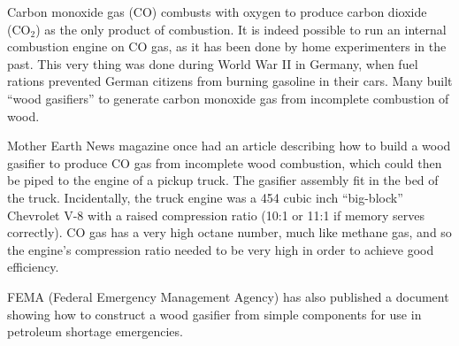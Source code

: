 \vskip 10pt

Carbon monoxide gas (CO) combusts with oxygen to produce carbon dioxide (CO$_{2}$) as the only product of combustion.  It is indeed possible to run an internal combustion engine on CO gas, as it has been done by home experimenters in the past.  This very thing was done during World War II in Germany, when fuel rations prevented German citizens from burning gasoline in their cars.  Many built ``wood gasifiers'' to generate carbon monoxide gas from incomplete combustion of wood.

Mother Earth News magazine once had an article describing how to build a wood gasifier to produce CO gas from incomplete wood combustion, which could then be piped to the engine of a pickup truck.  The gasifier assembly fit in the bed of the truck.  Incidentally, the truck engine was a 454 cubic inch ``big-block'' Chevrolet V-8 with a raised compression ratio (10:1 or 11:1 if memory serves correctly).  CO gas has a very high octane number, much like methane gas, and so the engine's compression ratio needed to be very high in order to achieve good efficiency.

FEMA (Federal Emergency Management Agency) has also published a document showing how to construct a wood gasifier from simple components for use in petroleum shortage emergencies.




